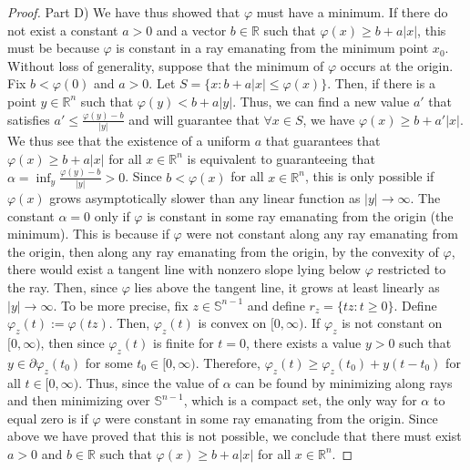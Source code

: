 \documentclass[10pt,a4paper]{amsart}
\begin{document}
\begin{proof}
Part D) We have thus showed that $\varphi$ must have a minimum. If there do not exist a constant $a>0$ and a vector $b \in \mathbb{R}$ such that $\varphi(x) \geq b + a \vert x \vert$, this must be because $\varphi$ is constant in a ray emanating from the minimum point $x_0$. Without loss of generality, suppose that the minimum of $\varphi$ occurs at the origin. Fix $b  < \varphi(0)$ and $a>0$. Let $S = \{ x: b + a \vert x \vert \leq \varphi(x) \}$. Then, if there is a point $y \in \mathbb{R}^n$ such that $\varphi(y) < b + a \vert y \vert$. Thus, we can find a new value $a'$ that satisfies $a' \leq \frac{\varphi(y) - b}{\vert y \vert}$ and will guarantee that $\forall x \in S$, we have $\varphi(x) \geq b + a' \vert x \vert$. We thus see that the existence of a uniform $a$ that guarantees that $\varphi(x) \geq b + a \vert x \vert$ for all $x \in \mathbb{R}^n$ is equivalent to guaranteeing that $\alpha = \inf_{y} \frac{\varphi(y) - b}{\vert y \vert} > 0$. Since $b<\varphi(x)$ for all $x \in \mathbb{R}^n$, this is only possible if $\varphi(x)$ grows asymptotically slower than any linear function as $\vert y \vert \rightarrow \infty$. The constant $\alpha = 0$ only if $\varphi$ is constant in some ray emanating from the origin (the minimum). This is because if $\varphi$ were not constant along any ray emanating from the origin, then along any ray emanating from the origin, by the convexity of $\varphi$, there would exist a tangent line with nonzero slope lying below $\varphi$ restricted to the ray. Then, since $\varphi$ lies above the tangent line, it grows at least linearly as $\vert y \vert \rightarrow \infty$. To be more precise, fix $z \in \mathbb{S}^{n-1}$ and define $r_{z} = \{ t z : t \geq 0 \}$. Define $\varphi_{z}(t) := \varphi(t z)$. Then, $\varphi_{z}(t)$ is convex on $[0, \infty)$. If $\varphi_{z}$ is not constant on $[0, \infty)$, then since $\varphi_{z}(t)$ is finite for $t = 0$, there exists a value $y >0$ such that $y \in \partial \varphi_{z}(t_0)$ for some $t_0 \in [0, \infty)$. Therefore, $\varphi_{z}(t) \geq \varphi_{z}(t_0) + y(t - t_0)$ for all $t \in [0, \infty)$. Thus, since the value of $\alpha$ can be found by minimizing along rays and then minimizing over $\mathbb{S}^{n-1}$, which is a compact set, the only way for $\alpha$ to equal zero is if $\varphi$ were constant in some ray emanating from the origin. Since above we have proved that this is not possible, we conclude that there must exist $a>0$ and $b \in \mathbb{R}$ such that $\varphi(x) \geq b + a \vert x \vert$ for all $x \in \mathbb{R}^n$.


\end{proof}
\end{document}
